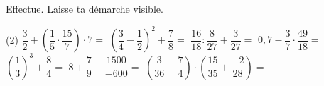 %
%
Effectue. Laisse ta démarche visible.
  \begin{tasks}(2)
    \task $\dfrac{3}{2}+\left(\dfrac{1}{5}\cdot \dfrac{15}{7}\right)\cdot 7=$
    \task $\left(\dfrac{3}{4}-\dfrac{1}{2}\right)^2+\dfrac{7}{8}=$
    \task $\dfrac{16}{18} : \dfrac{8}{27}+\dfrac{3}{27}=$
    \task $0,7-\dfrac{3}{7} \cdot \dfrac{49}{18}=$
    \task $\left(\dfrac{1}{3}\right)^3 + \dfrac{8}{4}=$
    \task $8+\dfrac{7}{9}-\dfrac{1500}{-600}=$
    \task $\left(\dfrac{3}{36}-\dfrac{7}{4}\right) \cdot \left(\dfrac{15}{35}+\dfrac{-2}{28}\right)=$
  \end{tasks}
